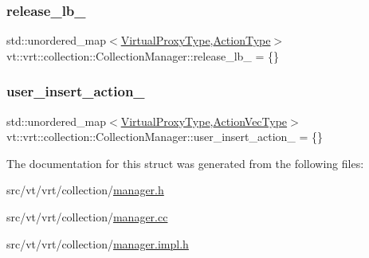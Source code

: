 \mbox{\label{structvt_1_1vrt_1_1collection_1_1_collection_manager_a42ea6d7733a75f09738a877e90db9aa1}} 
\subsubsection{\texorpdfstring{release\+\_\+lb\+\_\+}{release\_lb\_}}
{\footnotesize\ttfamily std\+::unordered\+\_\+map$<$\hyperlink{namespacevt_a1b417dd5d684f045bb58a0ede70045ac}{Virtual\+Proxy\+Type},\hyperlink{namespacevt_ae0a5a7b18cc99d7b732cb4d44f46b0f3}{Action\+Type}$>$ vt\+::vrt\+::collection\+::\+Collection\+Manager\+::release\+\_\+lb\+\_\+ = \{\}\hspace{0.3cm}{\ttfamily [private]}}

\mbox{\label{structvt_1_1vrt_1_1collection_1_1_collection_manager_a8d436079bfbadeacdf0584b01c150c29}} 
\subsubsection{\texorpdfstring{user\+\_\+insert\+\_\+action\+\_\+}{user\_insert\_action\_}}
{\footnotesize\ttfamily std\+::unordered\+\_\+map$<$\hyperlink{namespacevt_a1b417dd5d684f045bb58a0ede70045ac}{Virtual\+Proxy\+Type},\hyperlink{structvt_1_1vrt_1_1collection_1_1_collection_manager_a51650235f0e53ae08381942eba822679}{Action\+Vec\+Type}$>$ vt\+::vrt\+::collection\+::\+Collection\+Manager\+::user\+\_\+insert\+\_\+action\+\_\+ = \{\}\hspace{0.3cm}{\ttfamily [private]}}



The documentation for this struct was generated from the following files\+:\begin{DoxyCompactItemize}
\item 
src/vt/vrt/collection/\hyperlink{vrt_2collection_2manager_8h}{manager.\+h}\item 
src/vt/vrt/collection/\hyperlink{vrt_2collection_2manager_8cc}{manager.\+cc}\item 
src/vt/vrt/collection/\hyperlink{vrt_2collection_2manager_8impl_8h}{manager.\+impl.\+h}\end{DoxyCompactItemize}
